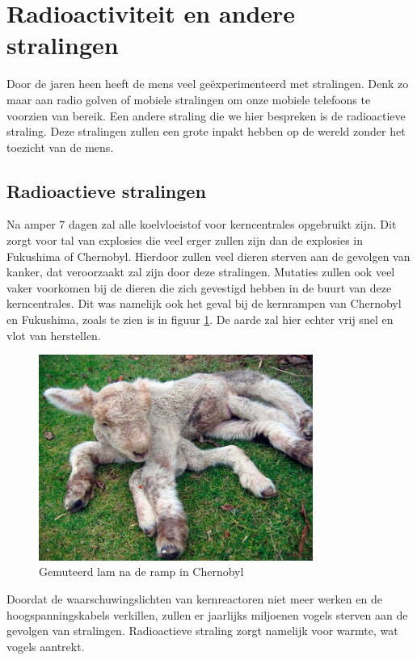 \section{Radioactiviteit en andere stralingen}
Door de jaren heen heeft de mens veel ge\"{e}xperimenteerd met stralingen. Denk zo maar aan radio golven of mobiele stralingen om onze mobiele telefoons te voorzien van bereik. Een andere straling die we hier bespreken is de radioactieve straling. Deze stralingen zullen een grote inpakt hebben op de wereld zonder het toezicht van de mens.
\subsection{Radioactieve stralingen}
Na amper 7 dagen zal alle koelvloeistof voor kerncentrales opgebruikt zijn. Dit zorgt voor tal van explosies die veel erger zullen zijn dan de explosies in Fukushima of Chernobyl. Hierdoor zullen veel dieren sterven aan de gevolgen van kanker, dat veroorzaakt zal zijn door deze stralingen. Mutaties zullen ook veel vaker voorkomen bij de dieren die zich gevestigd hebben in de buurt van deze kerncentrales. Dit was namelijk ook het geval bij de kernrampen van Chernobyl en Fukushima, zoals te zien is in figuur \ref{fig:mutatielam}. De aarde zal hier echter vrij snel en vlot van herstellen.\cite{LAPOutbreak} 
\begin{figure}[h]
	\centering
	\includegraphics[width=0.8\textwidth]{ChernobylLam.jpg}
	\caption{Gemuteerd lam na de ramp in Chernobyl \cite{ChernobylMutations}}
	\label{fig:mutatielam}
\end{figure}
\newline\newline
Doordat de waarschuwingslichten van kernreactoren niet meer werken en de hoogspanningskabels verkillen, zullen er jaarlijks miljoenen vogels sterven aan de gevolgen van stralingen. Radioactieve straling zorgt namelijk voor warmte, wat vogels aantrekt.
